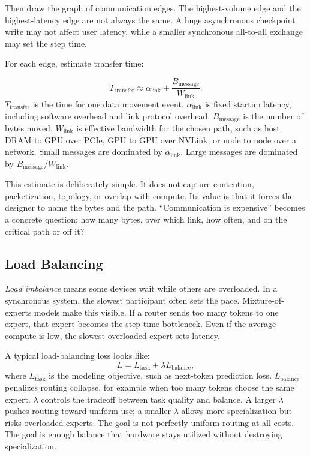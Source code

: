 Then draw the graph of communication edges. The highest-volume edge and the highest-latency edge are not always the same. A huge asynchronous checkpoint write may not affect user latency, while a smaller synchronous all-to-all exchange may set the step time.

For each edge, estimate transfer time:
\begin{keyequation}
\[
  T_{\text{transfer}} \approx
  \alpha_{\text{link}} +
  \frac{B_{\text{message}}}{W_{\text{link}}}.
\]
\tcblower
\(T_{\text{transfer}}\) is the time for one data movement event. \(\alpha_{\text{link}}\) is fixed startup latency, including software overhead and link protocol overhead. \(B_{\text{message}}\) is the number of bytes moved. \(W_{\text{link}}\) is effective bandwidth for the chosen path, such as host DRAM to GPU over PCIe, GPU to GPU over NVLink, or node to node over a network. Small messages are dominated by \(\alpha_{\text{link}}\). Large messages are dominated by \(B_{\text{message}} / W_{\text{link}}\).
\end{keyequation}

This estimate is deliberately simple. It does not capture contention, packetization, topology, or overlap with compute. Its value is that it forces the designer to name the bytes and the path. ``Communication is expensive'' becomes a concrete question: how many bytes, over which link, how often, and on the critical path or off it?

\subsection{Load Balancing}

\emph{Load imbalance} means some devices wait while others are overloaded. In a synchronous system, the slowest participant often sets the pace. Mixture-of-experts models make this visible. If a router sends too many tokens to one expert, that expert becomes the step-time bottleneck. Even if the average compute is low, the slowest overloaded expert sets latency.

A typical load-balancing loss looks like:
\[
  L = L_{\text{task}} + \lambda L_{\text{balance}},
\]
where \(L_{\text{task}}\) is the modeling objective, such as next-token prediction loss. \(L_{\text{balance}}\) penalizes routing collapse, for example when too many tokens choose the same expert. \(\lambda\) controls the tradeoff between task quality and balance. A larger \(\lambda\) pushes routing toward uniform use; a smaller \(\lambda\) allows more specialization but risks overloaded experts. The goal is not perfectly uniform routing at all costs. The goal is enough balance that hardware stays utilized without destroying specialization.


